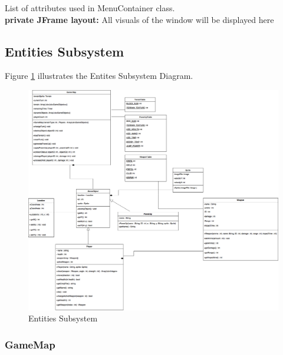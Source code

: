 \documentclass[12pt]{article} %
\begin{document}
List of attributes used in MenuContainer class.\\
\textbf{private JFrame layout:} All visuals of the window will be displayed here\\




\subsection{Entities Subsystem}

Figure \ref{fig:entity} illustrates the Entites Subsystem Diagram.

\begin{figure}[h!]
   \centering
   \vspace{10pt}%
   \includegraphics[width=17cm]{entity.png}
   \caption{Entities Subsystem}
   \label{fig:entity}
\end{figure}

\subsubsection{GameMap} %
\end{document}
